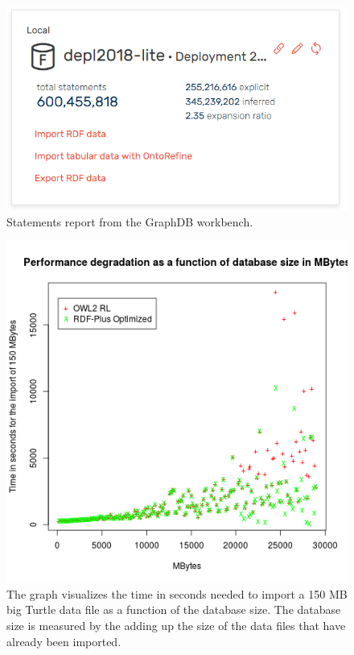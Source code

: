 \begin{figure}
\centering
\includegraphics[width=\textwidth]{Figures/active-repository}
\decoRule
\caption[Statements report]{Statements report from the GraphDB workbench.}
\label{fig:statements-report}
\end{figure}

\begin{figure}
\centering
\includegraphics[width=\textwidth]{Figures/performance-degradation-both}
\decoRule
\caption[Performance degradation]{The graph visualizes the time in seconds needed to import a 150 MB big Turtle data file as a function of the database size. The database size is measured by the adding up the size of the data files that have already been imported.}
\label{fig:performance-degradation}
\end{figure}

